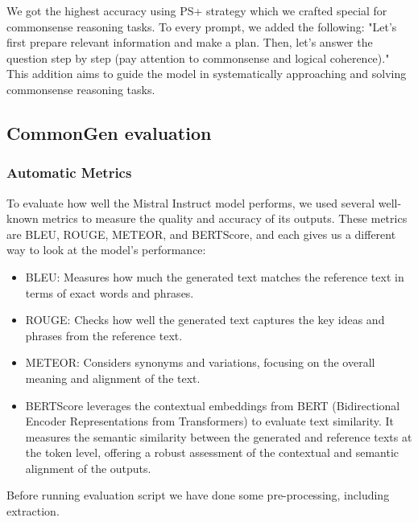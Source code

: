 \documentclass[fleqn,moreauthors,10pt]{ds_report}
\begin{document}
We got the highest accuracy using PS+ strategy which we crafted special for commonsense reasoning tasks. 
To every prompt, we added the following: "Let's first prepare relevant information and make a plan. Then, let's answer the question step by step (pay attention to commonsense and logical coherence)." This addition aims to guide the model in systematically approaching and solving commonsense reasoning tasks. 


\subsection*{CommonGen evaluation}
\subsubsection*{Automatic Metrics}
To evaluate how well the Mistral Instruct model performs, we used several well-known metrics to measure the quality and accuracy of its outputs. These metrics are BLEU, ROUGE, METEOR, and BERTScore, and each gives us a different way to look at the model's performance:

\begin{itemize}
    \item BLEU: Measures how much the generated text matches the reference text in terms of exact words and phrases.
\end{itemize}
\begin{itemize}
    \item ROUGE: Checks how well the generated text captures the key ideas and phrases from the reference text.
\end{itemize}
\begin{itemize}
    \item METEOR: Considers synonyms and variations, focusing on the overall meaning and alignment of the text.
\end{itemize}
\begin{itemize}
    \item BERTScore leverages the contextual embeddings from BERT (Bidirectional Encoder Representations from Transformers) to evaluate text similarity. It measures the semantic similarity between the generated and reference texts at the token level, offering a robust assessment of the contextual and semantic alignment of the outputs.
\end{itemize}

Before running evaluation script we have done some pre-processing, including extraction. 
\end{document}

